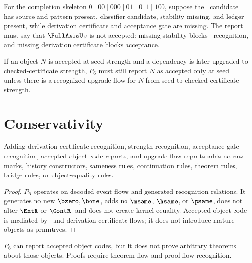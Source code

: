 \begin{example}
\label{ex:deriv-accept-fullaxis-not-accepted}
For the completion skeleton $0\mid 00\mid 000\mid 01\mid 011\mid 100$, suppose the \NameCert\ candidate has source and pattern present, classifier candidate, stability missing, and ledger present, while derivation certificate and acceptance gate are missing. The report must say that $\FullAxisUp$ is not accepted: missing stability blocks \NameCert\ recognition, and missing derivation certificate blocks acceptance.
\end{example}

\begin{example}
\label{ex:deriv-accept-no-retroactive-promotion}
If an object $N$ is accepted at seed strength and a dependency is later upgraded to checked-certificate strength, $P_6$ must still report $N$ as accepted only at seed unless there is a recognized upgrade flow for $N$ from seed to checked-certificate strength.
\end{example}

\section{Conservativity}
\label{sec:deriv-accept-conservativity}

\begin{theorem}
\label{thm:deriv-accept-p6-conservative}
Adding derivation-certificate recognition, strength recognition, acceptance-gate recognition, accepted object code reports, and upgrade-flow reports adds no raw marks, history constructors, sameness rules, continuation rules, theorem rules, bridge rules, or object-equality rules.
\end{theorem}

\begin{proof}
$P_6$ operates on decoded event flows and generated recognition relations. It generates no new $\bzero,\bone$, adds no $\msame$, $\hsame$, or $\psame$, does not alter $\ExtR$ or $\ContR$, and does not create kernel equality. Accepted object code is mediated by \NameCert\ and derivation-certificate flows; it does not introduce mature objects as primitives.
\end{proof}

\begin{corollary}
\label{cor:deriv-accept-p6-not-proof-engine}
$P_6$ can report accepted object codes, but it does not prove arbitrary theorems about those objects. Proofs require theorem-flow and proof-flow recognition.
\end{corollary}

